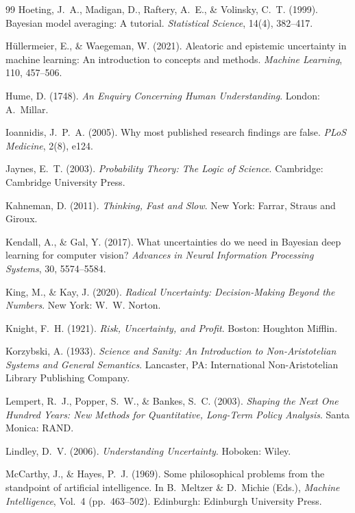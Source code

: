 \documentclass[11pt,a4paper]{article}
\begin{document}
\begin{thebibliography}{99}
Hoeting, J.~A., Madigan, D., Raftery, A.~E., \& Volinsky, C.~T. (1999).
Bayesian model averaging: A tutorial. \emph{Statistical Science}, 14(4),
382--417.

H\"ullermeier, E., \& Waegeman, W. (2021). Aleatoric and epistemic
uncertainty in machine learning: An introduction to concepts and
methods. \emph{Machine Learning}, 110, 457--506.

Hume, D. (1748). \emph{An Enquiry Concerning Human Understanding}.
London: A.~Millar.

Ioannidis, J.~P.~A. (2005). Why most published research findings are
false. \emph{PLoS Medicine}, 2(8), e124.

Jaynes, E.~T. (2003). \emph{Probability Theory: The Logic of Science}.
Cambridge: Cambridge University Press.

Kahneman, D. (2011). \emph{Thinking, Fast and Slow}. New York: Farrar,
Straus and Giroux.

Kendall, A., \& Gal, Y. (2017). What uncertainties do we need in Bayesian
deep learning for computer vision? \emph{Advances in Neural Information
Processing Systems}, 30, 5574--5584.

King, M., \& Kay, J. (2020). \emph{Radical Uncertainty: Decision-Making
Beyond the Numbers}. New York: W.~W. Norton.

Knight, F.~H. (1921). \emph{Risk, Uncertainty, and Profit}. Boston:
Houghton Mifflin.

Korzybski, A. (1933). \emph{Science and Sanity: An Introduction to
Non-Aristotelian Systems and General Semantics}. Lancaster, PA:
International Non-Aristotelian Library Publishing Company.

Lempert, R.~J., Popper, S.~W., \& Bankes, S.~C. (2003). \emph{Shaping
the Next One Hundred Years: New Methods for Quantitative, Long-Term
Policy Analysis}. Santa Monica: RAND.

Lindley, D.~V. (2006). \emph{Understanding Uncertainty}. Hoboken: Wiley.

McCarthy, J., \& Hayes, P.~J. (1969). Some philosophical problems from
the standpoint of artificial intelligence. In B.~Meltzer \& D.~Michie
(Eds.), \emph{Machine Intelligence}, Vol.~4 (pp.~463--502). Edinburgh:
Edinburgh University Press.


\end{thebibliography}
\end{document}
